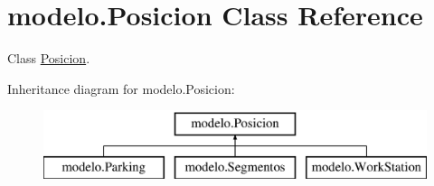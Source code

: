 \hypertarget{classmodelo_1_1_posicion}{}\section{modelo.\+Posicion Class Reference}
\label{classmodelo_1_1_posicion}


Class \mbox{\hyperlink{classmodelo_1_1_posicion}{Posicion}}.  


Inheritance diagram for modelo.\+Posicion\+:\begin{figure}[H]
\begin{center}
\leavevmode
\includegraphics[height=2.000000cm]{classmodelo_1_1_posicion}
\end{center}
\end{figure}
